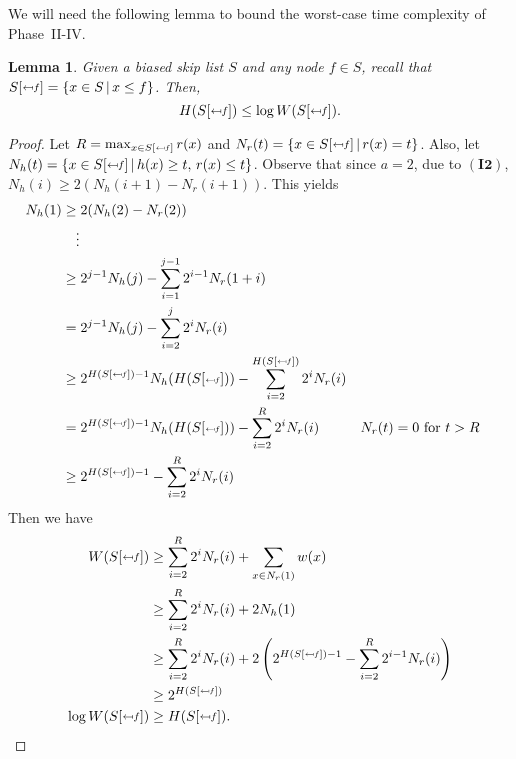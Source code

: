 \documentclass[11pt]{article}
\newcommand{\invtwo}{\ensuremath{\mathbf{(I2)}}}
\newcommand{\maxrank}{\ensuremath{R}}
\newcommand{\nodeheight}[1]{\ensuremath{h(#1)}}
\newcommand{\intheight}[1]{\ensuremath{H(#1)}}
\newcommand{\setweight}[1]{{\ensuremath{W(\set #1)}}}
\newcommand{\nodeweight}[1]{{\ensuremath{w(\node #1)}}}
\newcommand{\noderank}[1]{\ensuremath{r(\node #1)}}
\newcommand{\node}[1]{\ensuremath{#1}}
\newcommand{\set}[1]{\ensuremath{#1}}
\newcommand{\prebsltempl}[4]{\ensuremath{#1{[\raisebox{#4}{$#3\mapsfrom\hspace{-0.0mm}#2$}]}}}
\newcommand{\prebsl}[2]{\ensuremath{\prebsltempl{#1}{#2}{\scriptstyle}{0.3mm}}}
\newcommand{\prebslsub}[2]{\ensuremath{\prebsltempl{#1}{#2}{\scriptscriptstyle}{0.2mm}}}
\newcommand{\bsl}[1]{\ensuremath{#1}}
\newcommand{\nodesatlevel}[1]{\ensuremath{N_{h}{(#1)}}}
\newcommand{\ranksatlevel}[1]{\ensuremath{N_{r}{(#1)}}}
\newcounter{count}
\newtheorem{lemma}[count]{Lemma}
\begin{document}
We will need the following lemma to bound the worst-case time complexity of Phase~II-IV. 

\begin{lemma} 
\label{lem:height} 
Given a biased skip list \bsl S and any node $\node f \in \bsl S$, recall that $\prebsl{S}{f} = \{x\in S\,|\,x\leq f\}$. Then, 
\[ 
\intheight{\prebsl{S}{f}} \leq \log \setweight{\prebsl{S}{f}}. 
\] 
\end{lemma} 

\begin{proof} 
Let $\maxrank = \max_{\node x\in \prebslsub{S}{f}} \noderank x$ and $\ranksatlevel{t} = \{x\in\prebsl{S}{f}\,|\,\noderank{x} = t\}$. Also, let $\nodesatlevel{t} = \{x\in\prebsl{S}{f}\,|\,\nodeheight{x} \geq t,\, \noderank x \leq t\}$. 
Observe that since $a=2$, due to \invtwo{}, $\nodesatlevel i \geq 2(\nodesatlevel{i+1}-\ranksatlevel{i+1})$.
This yields
\begin{align*} 
\nodesatlevel{1} 
&\geq 2(\nodesatlevel{2} - \ranksatlevel{2})\\ 
&\quad\vdots\\
&\geq 2^{j-1}\nodesatlevel{j} - \sum_{i=1}^{j-1} 2^{i-1}\ranksatlevel{1+i}\\ 
&= 2^{j-1}\nodesatlevel{j} - \sum_{i=2}^{j} 2^{i}\ranksatlevel{i}\\ 
&\geq 2^{\intheight{\prebslsub{S}{f}}-1}\nodesatlevel{\intheight{\prebslsub{S}{f}}} - \sum_{i=2}^{\intheight{\prebslsub{S}{f}}} 2^{i}\ranksatlevel{i}\\ 
&= 2^{\intheight{\prebslsub{S}{f}}-1}\nodesatlevel{\intheight{\prebslsub{S}{f}}} - \sum_{i=2}^{\maxrank} 2^{i}\ranksatlevel{i}
&& \ranksatlevel{t} = 0 \text{ for } t>R\\  
&\geq 2^{\intheight{\prebslsub{S}{f}}-1} - \sum_{i=2}^{\maxrank} 2^{i}\ranksatlevel{i}
\end{align*}
Then we have 
\begin{align*} 
\setweight{\prebsl{S}{f}} 
&\geq \sum_{i=2}^\maxrank 2^i\ranksatlevel{i} + \sum_{x\in\ranksatlevel 1} \nodeweight x\\ 
&\geq \sum_{i=2}^\maxrank 2^i\ranksatlevel{i} + 2\nodesatlevel{1}\\
&\geq\sum_{i=2}^\maxrank 2^i\ranksatlevel{i} + 2\left(2^{\intheight{\prebslsub{S}{f}}-1} - \sum_{i=2}^R 2^{i-1}\ranksatlevel{i}\right)\\ 
&\geq 2^{\intheight{\prebslsub{S}{f}}}\\ 
\log\setweight{\prebsl{S}{f}} &\geq \intheight{\prebsl{S}{f}}.  
\end{align*} 
\end{proof} 
\end{document}
